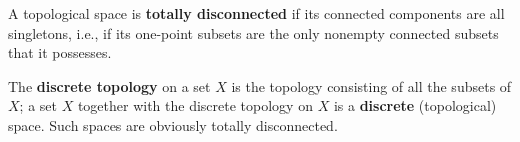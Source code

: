 A topological space is \textbf{totally disconnected} if its connected components are all singletons, i.e., if its one-point subsets are the only nonempty connected subsets that it possesses.

The \textbf{discrete topology} on a set $X$ is the topology consisting of all the subsets of $X$; a set $X$ together with the discrete topology on $X$ is a \textbf{discrete} (topological) space. Such spaces are obviously totally disconnected.
